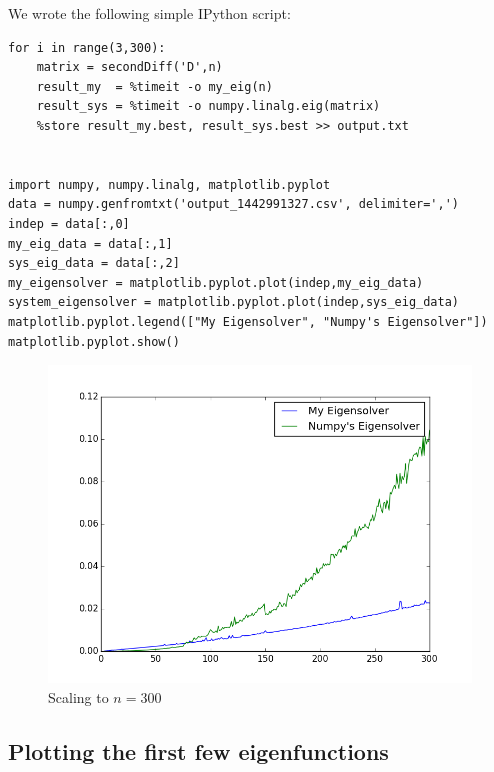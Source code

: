 \documentclass[12pt,]{book}
\begin{document}
We wrote the following simple IPython script:

\begin{verbatim}
for i in range(3,300):
    matrix = secondDiff('D',n)
    result_my  = %timeit -o my_eig(n)
    result_sys = %timeit -o numpy.linalg.eig(matrix)
    %store result_my.best, result_sys.best >> output.txt


import numpy, numpy.linalg, matplotlib.pyplot
data = numpy.genfromtxt('output_1442991327.csv', delimiter=',')
indep = data[:,0]
my_eig_data = data[:,1]
sys_eig_data = data[:,2]
my_eigensolver = matplotlib.pyplot.plot(indep,my_eig_data)
system_eigensolver = matplotlib.pyplot.plot(indep,sys_eig_data)
matplotlib.pyplot.legend(["My Eigensolver", "Numpy's Eigensolver"])
matplotlib.pyplot.show()
\end{verbatim}

\begin{figure}
\centering
\includegraphics[width=\textwidth]{assets/graphics/figure_1.png}
\caption{Scaling to $n=300$}
\end{figure}

\vfill

\pagebreak

\subsection{Plotting the first few
eigenfunctions}\label{plotting-the-first-few-eigenfunctions}
\end{document}
